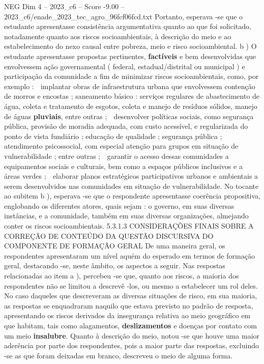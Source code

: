\begin{textsample}{NEG Dim 4 – 2023\_c6 – Score -9.00 – 2023\_c6/enade\_2023\_tec\_agro\_96fcf06fcd.txt}
Portanto, esperava -se que o estudante apresentasse consistência argumentativa quanto ao que foi solicitado, notadamente quanto aos riscos socioambientais, à descrição do meio e ao estabelecimento do nexo causal entre pobreza, meio e risco socioambiental. b ) O estudante apresentasse propostas pertinentes, \textbf{factíveis} e bem desenvolvidas que envolvessem ação governamental ( federal, estadual/distrital ou municipal ) e participação da comunidade a fim de minimizar riscos socioambientais, como, por exemplo :  implantar obras de infraestrutura urbana que envolvessem contenção de morros e encostas ; saneamento básico : serviços regulares de abastecimento de água, coleta e tratamento de esgotos, coleta e manejo de resíduos sólidos, manejo de águas \textbf{pluviais}, entre outras ;  desenvolver políticas sociais, como segurança pública, provisão de moradia adequada, com custo acessível, e regularizada do ponto de vista fundiário ; educação de qualidade ; segurança pública ; atendimento psicossocial, com especial atenção para grupos em situação de vulnerabilidade ; entre outras ;  garantir o acesso dessas comunidades a equipamentos sociais e culturais, bem como a espaços públicos inclusivos e a áreas verdes ;  elaborar planos estratégicos participativos urbanos e ambientais a serem desenvolvidos nas comunidades em situação de vulnerabilidade.
No tocante ao subitem b ), esperava -se que o respondente apresentasse coerência propositiva, englobando os diferentes atores, quais sejam : o governo, em suas diversas instâncias, e a comunidade, também em suas diversas organizações, almejando conter os riscos socioambientais. 5.3.1.3 CONSIDERAÇÕES FINAIS SOBRE A CORREÇÃO DE CONTEÚDO DA QUESTÃO DISCURSIVA DO COMPONENTE DE FORMAÇÃO GERAL De uma maneira geral, os respondentes apresentaram um nível aquém do esperado em termos de formação geral, destacando -se, neste âmbito, os aspectos a seguir.
Nas respostas relacionadas ao item a ), percebeu -se que, quanto aos riscos, a maioria dos respondentes não se limitou a descrevê -los, ou mesmo a estabelecer um rol deles.
No caso daqueles que descreveram as diversas situações de risco, em sua maioria, as respostas se enquadraram naquilo que estava previsto no padrão de resposta, apresentando os riscos derivados da insegurança relativa ao meio geográfico em que habitam, tais como alagamentos, \textbf{deslizamentos} e doenças por contato com um meio \textbf{insalubre}.
Quanto à descrição do meio, notou -se que houve uma maior aderência por parte dos respondentes, pois a maior parte das respostas, excluindo -se as que foram deixadas em branco, descreveu o meio de alguma forma.

\end{textsample}
